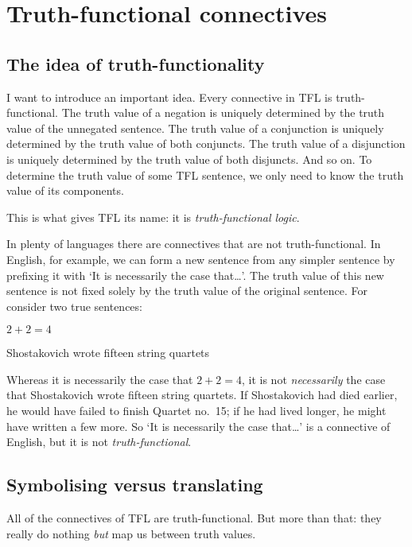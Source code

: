 \chapter{Truth-functional connectives}\label{s:TruthFunctionality}

\section{The idea of truth-functionality}
I want to introduce an important idea. 
Every connective in TFL is truth-functional. The truth value of a negation is uniquely determined by the truth value of the unnegated sentence. The truth value of a conjunction is uniquely determined by the truth value of both conjuncts. The truth value of a disjunction is uniquely determined by the truth value of both disjuncts. And so on. To determine the truth value of some TFL sentence, we only need to know the truth value of its components. 

This is what gives TFL its name: it is \emph{truth-functional logic}.

In plenty of languages there are connectives that are not truth-functional. In English, for example, we can form a new sentence from any simpler sentence by prefixing it with `It is necessarily the case that\ldots'. The truth value of this new sentence is not fixed solely by the truth value of the original sentence. For consider two true sentences:
	\begin{earg}
		\item $2 + 2 = 4$
		\item Shostakovich wrote fifteen string quartets
	\end{earg}
Whereas it is necessarily the case that $2 + 2 = 4$, it is not \emph{necessarily} the case that Shostakovich wrote fifteen string quartets. If Shostakovich had died earlier, he would have failed to finish Quartet no.\ 15; if he had lived longer, he might have written a few more. So `It is necessarily the case that\ldots' is a connective of English, but it is not \emph{truth-functional}.


\section{Symbolising versus translating}
All of the connectives of TFL are truth-functional. But more than that: they really do nothing \emph{but} map us between truth values.  


